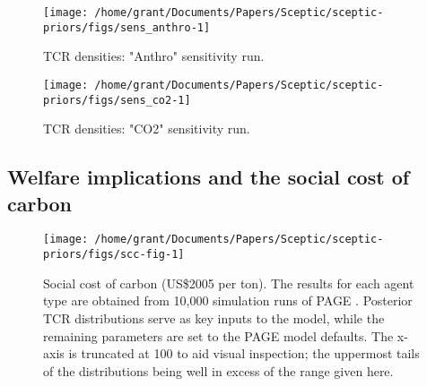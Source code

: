 \documentclass[
]{article}
\begin{document}
\begin{figure}

{\centering \texttt{[image: /home/grant/Documents/Papers/Sceptic/sceptic-priors/figs/sens\_anthro-1]} 

}

\caption{TCR densities: "Anthro" sensitivity run.}\label{fig:sens_anthro}
\end{figure}

\begin{figure}

{\centering \texttt{[image: /home/grant/Documents/Papers/Sceptic/sceptic-priors/figs/sens\_co2-1]} 

}

\caption{TCR densities: "CO2" sensitivity run.}\label{fig:sens_co2}
\end{figure}

\pagebreak

\hypertarget{welfare-implications-and-the-social-cost-of-carbon}{%
\subsection{Welfare implications and the social cost of
carbon}\label{welfare-implications-and-the-social-cost-of-carbon}}

\begin{figure}[h]

{\centering \texttt{[image: /home/grant/Documents/Papers/Sceptic/sceptic-priors/figs/scc-fig-1]} 

}

\caption{Social cost of carbon (US\$2005 per ton). The results for each agent type are obtained from 10,000 simulation runs of PAGE \cite{hope2011page09}. Posterior TCR distributions serve as key inputs to the model, while the remaining parameters are set to the PAGE model defaults. The x-axis is truncated at 100 to aid visual inspection; the uppermost tails of the distributions being well in excess of the range given here.}\label{fig:scc-fig}
\end{figure}

\newpage

  
\end{document}
